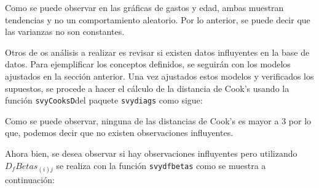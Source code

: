 \documentclass[
  12pt,
]{book}
\newenvironment{Shaded}{\begin{snugshade}}{\end{snugshade}}
\newcommand{\AttributeTok}[1]{\textcolor[rgb]{0.77,0.63,0.00}{#1}}
\newcommand{\DecValTok}[1]{\textcolor[rgb]{0.00,0.00,0.81}{#1}}
\newcommand{\FunctionTok}[1]{\textcolor[rgb]{0.00,0.00,0.00}{#1}}
\newcommand{\NormalTok}[1]{#1}
\newcommand{\OtherTok}[1]{\textcolor[rgb]{0.56,0.35,0.01}{#1}}
\newcommand{\SpecialCharTok}[1]{\textcolor[rgb]{0.00,0.00,0.00}{#1}}
\newcommand{\StringTok}[1]{\textcolor[rgb]{0.31,0.60,0.02}{#1}}
\begin{document}
Como se puede observar en las gráficas de gastos y edad, ambas muestran tendencias y no un comportamiento aleatorio. Por lo anterior, se puede decir que las varianzas no son constantes.

Otros de os análisis a realizar es revisar si existen datos influyentes en la base de datos. Para ejemplificar los conceptos definidos, se seguirán con los modelos ajustados en la sección anterior. Una vez ajustados estos modelos y verificados los supuestos, se procede a hacer el cálculo de la distancia de Cook's usando la función \texttt{svyCooksD}del paquete \texttt{svydiags} como sigue:

\begin{Shaded}
\end{Shaded}

Como se puede observar, ninguna de las distancias de Cook's es mayor a 3 por lo que, podemos decir que no existen observaciones influyentes.

Ahora bien, se desea observar si hay observaciones influyentes pero utilizando \(D_{f}Betas_{\left(i\right)j}\) se realiza con la función \texttt{svydfbetas} como se muestra a continuación:

\begin{Shaded}
\end{Shaded}
\end{document}
